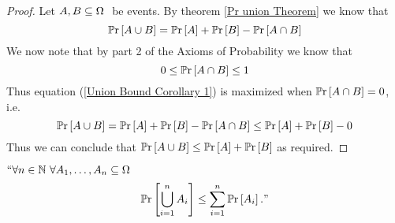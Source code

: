         \begin{proof}
            Let $A, B \subseteq \Omega \ $ be events. By theorem \ref{Pr union Theorem}
            we know that 
            \begin{equation}
                \mathbb{P}\mathrm{r} \left[A \cup B\right] = \mathbb{P}\mathrm{r} \left[A\right] + \mathbb{P}\mathrm{r} \left[B\right] - \mathbb{P}\mathrm{r} \left[A \cap B\right]
                \label{Union Bound Corollary 1}
            \end{equation}
            We now note that by part 2 of the Axioms of Probability we know that
            \[
                0 \le \mathbb{P}\mathrm{r} \left[A \cap B\right] \le 1
            \]
            Thus equation (\ref{Union Bound Corollary 1}) is maximized when $\mathbb{P}\mathrm{r} \left[A \cap B\right] = 0$, i.e.
            \[
                \mathbb{P}\mathrm{r} \left[A \cup B\right] = \mathbb{P}\mathrm{r} \left[A\right] + \mathbb{P}\mathrm{r} \left[B\right] - \mathbb{P}\mathrm{r} \left[A \cap B\right] \le \mathbb{P}\mathrm{r} \left[A\right] + \mathbb{P}\mathrm{r} \left[B\right] - 0
            \]
            Thus we can conclude that $\mathbb{P}\mathrm{r} \left[A \cup B\right] \le \mathbb{P}\mathrm{r} \left[A\right] + \mathbb{P}\mathrm{r} \left[B\right]$ as required. \QED
        \end{proof}
        \begin{theorem}
            \label{Union Bound}
            $``\forall n \in \mathbb{N} \ \forall A_1, \dots, A_n \subseteq \Omega \ $
            \[
                \mathbb{P}\mathrm{r} \left[\displaystyle\bigcup_{i = 1}^{n} A_i\right] \le \sum_{i = 1}^{n} \mathbb{P}\mathrm{r} \left[A_i\right]."
            \]
        \end{theorem}
